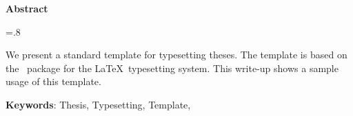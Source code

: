 


\pagestyle{empty}

\begin{latin}

\begin{center}
\textbf{Abstract}
\end{center}
\baselineskip=.8\baselineskip

We present a standard template for typesetting theses. 
The template is based on the \XePersian\ package for the \LaTeX\ typesetting system.
This write-up shows a sample usage of this template.


\bigskip\noindent\textbf{Keywords}:
Thesis, Typesetting, Template, \XePersian\

\end{latin}

\newpage
